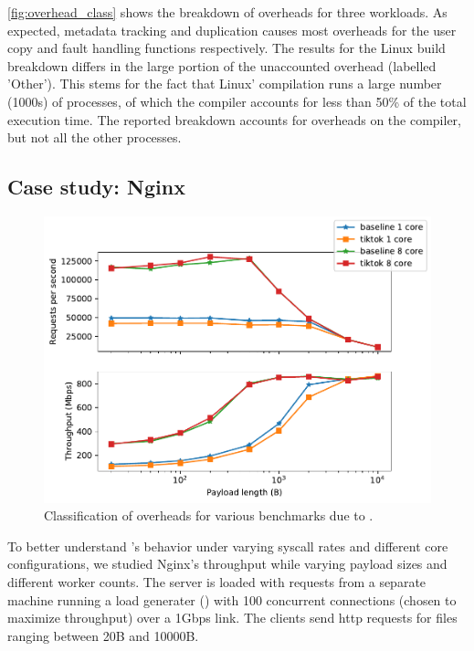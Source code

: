 \documentclass[letterpaper,twocolumn,10pt]{article}
\begin{document}
\autoref{fig:overhead_class} shows the breakdown of overheads for three 
workloads. 
As expected, metadata tracking and duplication causes most overheads
for the user copy and fault handling functions respectively.
The results for the Linux build breakdown differs in the large portion of 
the unaccounted overhead (labelled 'Other').
This stems for the fact that Linux' compilation runs a large number (1000s)
of processes, of which the compiler accounts for less than 50\% of the 
total execution time.
The reported breakdown accounts for overheads on the compiler, but not 
all the other processes.

\subsection{Case study: Nginx}

\begin{figure}
  \includegraphics[width=\linewidth]{img/nginx_performance.pdf}
  \caption{Classification of overheads for various benchmarks due to \tiktok.}
  \label{fig:nginx_perf}
\end{figure}

To better understand \tiktok's behavior under varying syscall 
rates and different core configurations, we studied Nginx's throughput
while varying payload sizes and different worker counts.
The server is loaded with requests from a separate machine running 
a load generater () with 100 concurrent 
connections (chosen to maximize throughput) over a 1Gbps link.
The clients send http requests for files ranging between 20B and
10000B.
\end{document}
